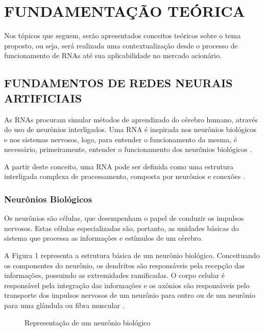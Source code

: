 
\chapter{FUNDAMENTAÇÃO TEÓRICA}\label{ch:fundaments-teorico}
Nos tópicos que seguem, serão apresentados conceitos teóricos sobre o tema proposto, ou seja, será realizada uma contextualização desde o processo de funcionamento de RNAs até sua aplicabilidade no mercado acionário.

\section{FUNDAMENTOS DE REDES NEURAIS ARTIFICIAIS}\label{sec:fundamentos}
As RNAs procuram simular métodos de aprendizado do cérebro humano, através do uso de neurônios interligados. Uma RNA é inspirada nos neurônios biológicos e nos sistemas nervosos, logo, para entender o funcionamento da mesma, é necessário, primeiramente, entender o funcionamento dos neurônios biológicos \cite{neto}.

A partir deste conceito, uma RNA pode ser definida como uma estrutura interligada complexa de processamento, composta por neurônios e conexões \cite{ferreira}.

\subsection{Neurônios Biológicos} 
Os neurônios são células, que desempenham o papel de conduzir os impulsos nervosos. Estas células especializadas são, portanto, as unidades básicas do sistema que processa as informações e estímulos de um cérebro\cite{lent}. 

A Figura 1 representa a estrutura básica de um neurônio biológico. Conceituando os componentes do neurônio, os dendritos são responsáveis pela recepção das informações, possuindo as extremidades ramificadas. O corpo celular é responsável pela integração das informações e os axônios são responsáveis pelo transporte dos impulsos nervosos de um neurônio para outro ou de um neurônio para uma glândula ou fibra muscular \cite{lent}.

\begin{figure}[h]
	\centering
	\caption{Representação de um neurônio biológico}
	\label{exec-linearmente-separavel}
\end{figure} 

